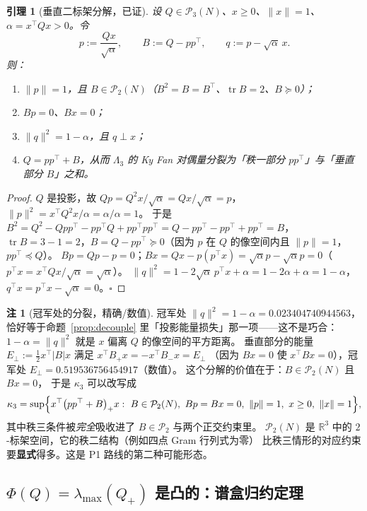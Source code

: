 \documentclass[UTF8,11pt]{ctexart}
\newtheorem{lemma}[theorem]{引理}
\theoremstyle{definition}
\newtheorem{remark}[theorem]{注}
\newcommand{\Lam}{\Lambda}
\newcommand{\tr}{\operatorname{tr}}
\newcommand{\R}{\mathbb{R}}
\begin{document}
\begin{lemma}[垂直二标架分解，已证]\label{lem:perp2}
设 $Q\in\mathcal P_3(N)$、$x\ge0$、$\|x\|=1$、$\alpha=x^\top Qx>0$。令
\[
p:=\frac{Qx}{\sqrt\alpha},\qquad B:=Q-pp^\top,\qquad q:=p-\sqrt\alpha\,x .
\]
则：
\begin{enumerate}[label=(\roman*),leftmargin=2.2em]
\item $\|p\|=1$，且 $B\in\mathcal P_2(N)$（$B^2=B=B^\top$、$\tr B=2$、$B\succeq0$）；
\item $Bp=0$、$Bx=0$；
\item $\|q\|^2=1-\alpha$，且 $q\perp x$；
\item $Q=pp^\top+B$，从而 $\Lam_3$ 的 Ky Fan 对偶量分裂为「秩一部分 $pp^\top$」与「垂直部分 $B$」之和。
\end{enumerate}
\end{lemma}

\begin{proof}
$Q$ 是投影，故 $Qp=Q^2x/\sqrt\alpha=Qx/\sqrt\alpha=p$，$\|p\|^2=x^\top Q^2x/\alpha=\alpha/\alpha=1$。
于是 $B^2=Q^2-Qpp^\top-pp^\top Q+pp^\top pp^\top=Q-pp^\top-pp^\top+pp^\top=B$，
$\tr B=3-1=2$，$B=Q-pp^\top\succeq0$（因为 $p$ 在 $Q$ 的像空间内且 $\|p\|=1$，$pp^\top\preceq Q$）。
$Bp=Qp-p=0$；$Bx=Qx-p(p^\top x)=\sqrt\alpha p-\sqrt\alpha p=0$（$p^\top x=x^\top Qx/\sqrt\alpha=\sqrt\alpha$）。
$\|q\|^2=1-2\sqrt\alpha\,p^\top x+\alpha=1-2\alpha+\alpha=1-\alpha$，$q^\top x=p^\top x-\sqrt\alpha=0$。$\square$
\end{proof}

\begin{remark}[冠军处的分裂，精确/数值]\label{rmk:perp2read}
冠军处 $\|q\|^2=1-\alpha=0.023404740944563$，
恰好等于命题~\ref{prop:decouple} 里「投影能量损失」那一项——这不是巧合：
$1-\alpha=\|q\|^2$ 就是 $x$ 偏离 $Q$ 的像空间的平方距离。
垂直部分的能量 $E_\perp:=\tfrac12x^\top|B|x$ 满足 $x^\top B_+x=-x^\top B_-x=E_\perp$
（因为 $Bx=0$ 使 $x^\top Bx=0$），冠军处 $E_\perp=0.519536756454917$（数值）。
这个分解的价值在于：$B\in\mathcal P_2(N)$ 且 $Bx=0$，
于是 $\kappa_3$ 可以改写成
\[
\kappa_3=\sup\Bigl\{x^\top\bigl(pp^\top+B\bigr)_+x:\ B\in\mathcal P_2(N),\ Bp=Bx=0,\ \|p\|=1,\ x\ge0,\ \|x\|=1\Bigr\},
\]
其中秩三条件被\emph{完全}吸收进了 $B\in\mathcal P_2$ 与两个正交约束里。
$\mathcal P_2(N)$ 是 $\R^3$ 中的 $2$-标架空间，它的秩二结构（例如四点 Gram 行列式为零）
比秩三情形的对应约束要\textbf{显式}得多。这是 P1 路线的第二种可能形态。
\end{remark}

\subsection{$\Phi(Q)=\lambda_{\max}(Q_+)$ 是凸的：谱盒归约定理}\label{sec:convex}
\end{document}
